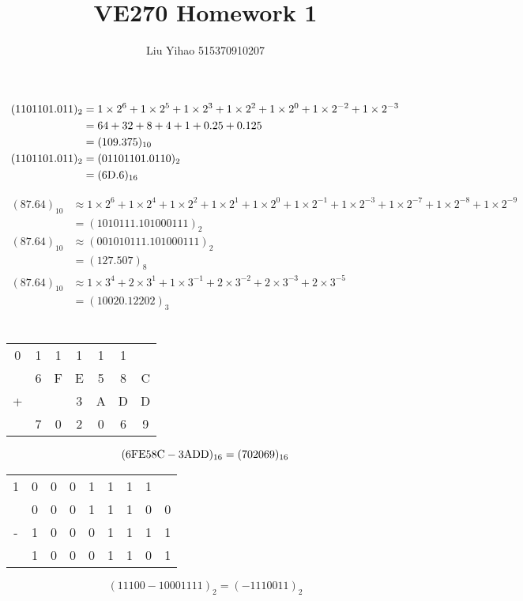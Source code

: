 \documentclass{article}
\title{VE270 Homework 1}
\author{Liu Yihao 515370910207}
\date{}
\begin{document}
\maketitle

\section{}
\begin{align*}
(1101101.011)_2
&=1\times2^6+1\times2^5+1\times2^3+1\times2^2
+1\times2^0+1\times2^{-2}+1\times2^{-3}\\
&=64+32+8+4+1+0.25+0.125\\
&=(109.375)_{10}\\
(1101101.011)_2
&=(01101101.0110)_2\\
&=\rm (6D.6)_{16}
\end{align*}

\begin{align*}
(87.64)_{10}
&\approx1\times2^6+1\times2^4+1\times2^2+1\times2^1+1\times2^0
+1\times2^{-1}+1\times2^{-3}+1\times2^{-7}+1\times2^{-8}+1\times2^{-9}\\
&=(1010111.101000111)_2\\
(87.64)_{10}
&\approx(001010111.101000111)_2\\
&=(127.507)_8\\
(87.64)_{10}
&\approx1\times3^4+2\times3^1+1\times3^{-1}+2\times3^{-2}+2\times3^{-3}
+2\times3^{-5}\\
&=(10020.12202)_3
\end{align*}

\section{}
\begin{center}
\begin{tabular}{ccccccc}
0&1&1&1&1&1\\
&6&F&E&5&8&C\\
+&&&3&A&D&D\\
\hline
&7&0&2&0&6&9
\end{tabular}
\end{center}
$$\rm(6FE58C-3ADD)_{16}=(702069)_{16}$$

\begin{center}
\begin{tabular}{ccccccccc}
1&0&0&0&1&1&1&1\\
&0&0&0&1&1&1&0&0\\
-&1&0&0&0&1&1&1&1\\
\hline
&1&0&0&0&1&1&0&1
\end{tabular}
\end{center}
$$(11100-10001111)_{2}=(-1110011)_{2}$$
\end{document}
